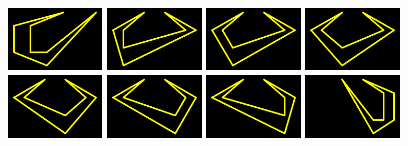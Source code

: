 \lhead[]{}
\rhead[]{}
\renewcommand{\headrulewidth}{0pt}
\newpage
\ %
\newpage
\vspace*{\fill}
\begin{figure}[H]
  \centering
    \includegraphics[width=2.5cm]{preface/vector_images/vec_image_curs1.png}
    \includegraphics[width=2.5cm]{preface/vector_images/vec_image_curs2.png}
    \includegraphics[width=2.5cm]{preface/vector_images/vec_image_curs3.png}
    \includegraphics[width=2.5cm]{preface/vector_images/vec_image_curs4.png}
    \includegraphics[width=2.5cm]{preface/vector_images/vec_image_curs5.png}
    \includegraphics[width=2.5cm]{preface/vector_images/vec_image_curs6.png}
    \includegraphics[width=2.5cm]{preface/vector_images/vec_image_curs7.png}
    \includegraphics[width=2.5cm]{preface/vector_images/vec_image_curs8.png}

\end{figure}
